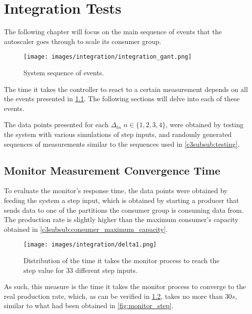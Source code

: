 \chapter{Integration Tests} 
\label{c4}

The following chapter will focus on the main sequence of events that the autoscaler goes through to scale its consumer group. 

\begin{figure}[H]
    \centering
    \texttt{[image: images/integration/integration\_gant.png]}
\caption{System sequence of events.}
\label{fig:step_event_sequence}
\end{figure}

The time it takes the controller to react to a certain measurement depends on all the events presented in \ref{fig:step_event_sequence}. The following sections will delve into each of these events. 

The data points presented for each $\Delta_{tn} \; n \in \{1, 2, 3, 4\}$, were obtained by testing the system with various simulations of step inputs, and randomly generated sequences of measurements similar to the sequences used in \ref{c3subsub:testing}.

\newpage
\section{Monitor Measurement Convergence Time}
\label{c3sec:MonitorMeasurement}

To evaluate the monitor's response time, the data points were obtained by feeding the system a step input, which is obtained by starting a producer that sends data to one of the partitions the consumer group is consuming data from. The production rate is slightly higher than the maximum consumer's capacity obtained in \ref{c3subsub:consumer_maximum_capacity}.

\begin{figure}[H]
    \centering
    \texttt{[image: images/integration/delta1.png]}
\caption{Distribution of the time it takes the monitor process to reach the step value for 33 different step inputs.}
\label{fig:controller_result_monitor}
\end{figure}

As such, this measure is the time it takes the monitor process to converge to the real production rate, which, as can be verified in \ref{fig:controller_result_monitor}, takes no more than $30s$, similar to what had been obtained in \ref{fig:monitor_step}.

